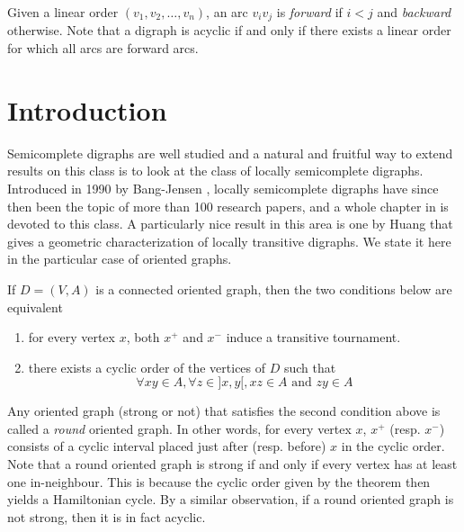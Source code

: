Given a linear order $(v_1,v_2,\ldots,v_n)$, an arc $v_iv_j$ is {\em forward} if $i<j$ and {\em backward} otherwise. Note that a digraph is acyclic if and only if there exists a linear order for which all arcs are forward arcs.




\section{Introduction}

Semicomplete digraphs are well studied and a natural and fruitful way to extend results on this class is to look at the class of locally semicomplete digraphs.
Introduced in 1990 by Bang-Jensen \cite{B90}, locally semicomplete digraphs have since then been the topic of more than 100 research papers, and a whole chapter in \cite{BG18} is devoted to this class. A particularly nice result in this area is one by Huang that gives a geometric characterization of locally transitive digraphs. We state it here in the particular case of oriented graphs.

\begin{theorem}\label{thm:round}
If $D=(V,A)$ is a connected oriented graph, then the two conditions below are equivalent 
\begin{enumerate}
    \item for every vertex $x$, both $x^+$ and $x^-$ induce a transitive tournament. 
    \item there exists a cyclic order of the vertices of $D$ such that 
$$\forall xy\in A, \forall z\in ]x,y[, xz\in A \text{ and } zy\in A$$
\end{enumerate}
\end{theorem} 




Any oriented graph (strong or not) that satisfies the second condition above  is called a \textit{round} oriented graph. In other words, for every vertex $x$, $x^+$ (resp. $x^-$) consists of a cyclic interval placed just after (resp. before) $x$ in the cyclic order. Note that a round oriented graph is strong if and only if every vertex has at least one in-neighbour. 
This is because the cyclic order given by the theorem then yields a Hamiltonian cycle. By a similar observation, if a round oriented graph is not strong, then it is in fact acyclic.%
\medskip


